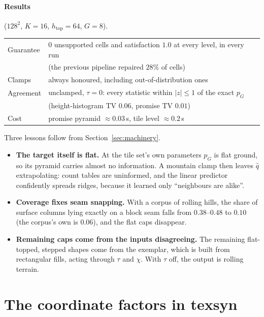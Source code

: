 \documentclass[11pt]{article}
\newcommand{\1}{\mathds{1}}
\begin{document}
\paragraph{Results} ($128^2$, $K = 16$, $h_{\text{top}} = 64$, $G = 8$).
\begin{center}
\begin{tabular}{@{}ll@{}}
\toprule
Guarantee & 0 unsupported cells and satisfaction $1.0$ at every level, in every run \\
          & (the previous pipeline repaired $28\%$ of cells) \\
Clamps & always honoured, including out-of-distribution ones \\
Agreement & unclamped, $\tau = 0$: every statistic within $|z| \le 1$ of the exact $p_G$ \\
          & (height-histogram TV $0.06$, promise TV $0.01$) \\
Cost & promise pyramid $\approx 0.03$\,s, tile level $\approx 0.2$\,s \\
\bottomrule
\end{tabular}
\end{center}
Three lessons follow from Section~\ref{sec:machinery}.
\begin{itemize}
  \item \textbf{The target itself is flat.} At the tile set's own parameters $p_G$ is flat
        ground, so its pyramid carries almost no information. A mountain clamp then leaves
        $\hat q$ extrapolating: count tables are uninformed, and the linear predictor
        confidently spreads ridges, because it learned only ``neighbours are alike''.
  \item \textbf{Coverage fixes seam snapping.} With a corpus of rolling hills, the share of
        surface columns lying exactly on a block seam falls from $0.38$--$0.48$ to $0.10$ (the
        corpus's own is $0.06$), and the flat caps disappear.
  \item \textbf{Remaining caps come from the inputs disagreeing.} The remaining flat-topped,
        stepped shapes come from the exemplar, which is built from rectangular fills, acting
        through $\tau$ and $\chi$. With $\tau$ off, the output is rolling terrain.
\end{itemize}

\section{The coordinate factors in texsyn}
\end{document}
